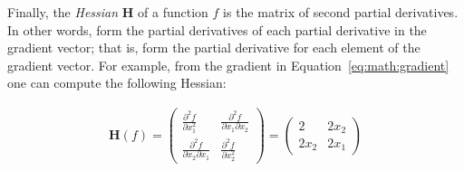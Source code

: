 Finally, the \emph{Hessian} $\mathbf{H}$ of a function $f$ is the matrix of second partial derivatives. In other words, form the partial derivatives of each partial derivative in the gradient vector; that is, form the partial derivative for each element of the gradient vector. For example, from the gradient in Equation~\ref{eq:math:gradient} one can compute the following Hessian:

\begin{align*}
\mathbf{H}(f) = \begin{pmatrix}
\frac{\partial^2 f}{\partial x_1^2} & \frac{\partial^2 f}{\partial x_1 \partial x_2} \\
\frac{\partial^2 f}{\partial x_2 \partial x_1} & \frac{\partial^2 f}{\partial x_2^2}
\end{pmatrix} = 
\begin{pmatrix}
2 & 2x_2 \\
2 x_2 & 2 x_1 \end{pmatrix}
\end{align*}

